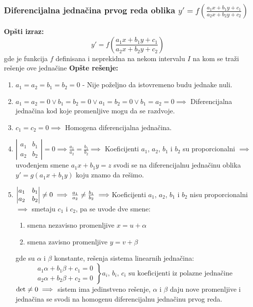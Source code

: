 \subsubsection{Diferencijalna jednačina prvog reda oblika $y' = f\left(\frac{a_1x+b_1y+c_1}{a_2x+b_2y+c_2}\right)$}
\textbf{Opšti izraz:}
$$y' = f\left(\frac{a_1x+b_1y+c_1}{a_2x+b_2y+c_2}\right)$$
gde je funkcija $f$ definisana i neprekidna na nekom intervalu $I$ na kom se traži rešenje ove jednačine
\textbf{Opšte rešenje:}
\begin{enumerate}[label = \alph*)]
	\item
		$a_1 = a_2 = b_1 = b_2 = 0$ - Nije poželjno da istovremeno budu jednake nuli.
	\item
		$a_1=a_2=0 \lor b_1=b_2=0 \lor a_1=b_2=0 \lor b_1=a_2=0 \implies$ Diferencijalna jednačina kod koje promenljive mogu da se razdvoje.
	\item
		$c_1=c_2=0 \implies$ Homogena diferencijalna jednačina.
	\item
		$\left|
		\begin{matrix}
			a_1 & b_1\\
			a_2 & b_2
		\end{matrix}
		\right| = 0 \implies \frac{a_1}{a_2}=\frac{b_1}{b_2}\implies$ Koeficijenti $ a_1$, $a_2$, $b_1$ i $b_2$ su proporcionalni $\implies$ uvođenjem smene $a_1x+b_1y=z$ svodi se na diferencijalnu jednačinu oblika $y'=g(a_1x+b_1y)$ koju znamo da rešimo.
	\item
		$\left|
		\begin{matrix}
			a_1 & b_1\\
			a_2 & b_2
		\end{matrix}
		\right| \centernot = 0 \implies \frac{a_1}{a_2}\centernot=\frac{b_1}{b_2}\implies$Koeficijenti $ a_1$, $a_2$, $b_1$ i $b_2$ nisu proporcionalni $\implies$ smetaju $c_1$ i $c_2$, pa se uvode dve smene:
		\begin{enumerate}[label = \arabic*)]
			\item
				smena nezavisno promenljive $x=u+\alpha$
			\item
				smena zavisno promenljive $y=v+\beta$		
		\end{enumerate}				
		gde su $\alpha$ i $\beta$ konstante, rešenja sistema linearnih jednačina:
		$$\left.
		\begin{aligned}
			a_1\alpha+b_1\beta +c_1=0\\
			a_2\alpha+b_2\beta +c_2=0
		\end{aligned}
		\right\}a_i,\, b_i,\, c_i \text{ su koeficijenti iz polazne jednačine}$$
		$\det \centernot = 0\implies$ sistem ima jedinstveno rešenje, $\alpha$ i $\beta$ daju nove promenljive i jednačina se svodi na homogenu diferencijalnu jednačinu prvog reda.
\end{enumerate}

